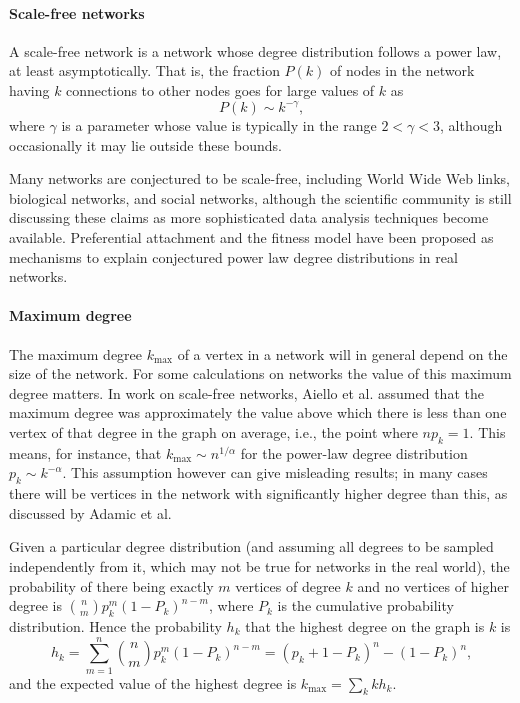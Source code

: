       \paragraph{Scale-free networks}
  
        A scale-free network is a network whose degree distribution follows a power law, at least asymptotically. That is, the fraction $P(k)$ of nodes in the network having $k$ connections to other nodes goes for large values of $k$ as
    \begin{equation}
      P(k) \sim k^{-\gamma} \mbox{,}
    \end{equation}
    where $\gamma$ is a parameter whose value is typically in the range $2 < \gamma < 3$, although occasionally it may lie outside these bounds.\cite{OnnelaSaramakiBarabasi2007,ChoromanskiMatuszakMiekisz2013}

        Many networks are conjectured to be scale-free, including World Wide Web links, biological networks, and social networks, although the scientific community is still discussing these claims as more sophisticated data analysis techniques become available.\cite{ClausetShaliziNewman2007} Preferential attachment and the fitness model have been proposed as mechanisms to explain conjectured power law degree distributions in real networks.
        
      \paragraph{Maximum degree}
      
        The maximum degree $k_{\mbox{max}}$ of a vertex in a network will in general depend on the size of the network. For some calculations on networks the value of this maximum degree matters. In work on scale-free networks, Aiello et al. \cite{AielloChungLu2000} assumed that the maximum degree was approximately the value above which there is less than one vertex of that degree in the graph on average, i.e., the point where $np_k = 1$. This means, for instance, that $k_{\mbox{max}} \sim n^{1/\alpha}$ for the power-law degree distribution $p_k \sim k^{−\alpha}$. This assumption however can give misleading results; in many cases there will be vertices in the network with significantly higher degree than this, as discussed by Adamic et al.\cite{AdamicLukosePuniyaniHuberman2001}
        
        Given a particular degree distribution (and assuming all degrees to be sampled independently from it, which may not be true for networks in the real world), the probability of there being exactly $m$ vertices of degree $k$ and no vertices of higher degree is $\binom{n}{m} p^m_k (1 − P_k)^{n−m}$, where $P_k$ is the cumulative probability distribution. Hence the probability $h_k$ that the highest degree on the graph is $k$ is
        \begin{equation}
          h_k = \sum_{m=1}^n \binom{n}{m} p^m_k (1 - P_k)^{n-m} = (p_k + 1 - P_k)^n - (1 - P_k)^n\mbox{,}
        \end{equation}
        and the expected value of the highest degree is $k_{\mbox{max}} = \sum_k kh_k$.
        
